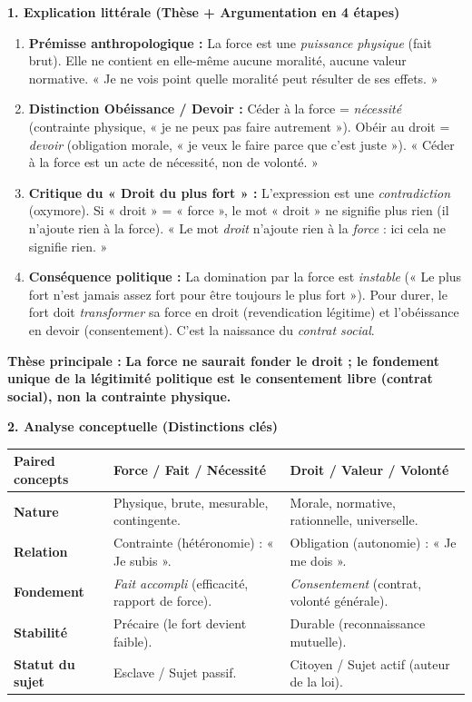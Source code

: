 \documentclass[11pt]{article}
\begin{document}
\begin{corrige}
\textbf{1. Explication littérale (Thèse + Argumentation en 4 étapes)}
\begin{enumerate}
    \item \textbf{Prémisse anthropologique :} La force est une \emph{puissance physique} (fait brut). Elle ne contient en elle-même aucune moralité, aucune valeur normative. « Je ne vois point quelle moralité peut résulter de ses effets. »
    \item \textbf{Distinction Obéissance / Devoir :} Céder à la force = \emph{nécessité} (contrainte physique, « je ne peux pas faire autrement »). Obéir au droit = \emph{devoir} (obligation morale, « je veux le faire parce que c'est juste »). « Céder à la force est un acte de nécessité, non de volonté. »
    \item \textbf{Critique du « Droit du plus fort » :} L'expression est une \emph{contradiction} (oxymore). Si « droit » = « force », le mot « droit » ne signifie plus rien (il n'ajoute rien à la force). « Le mot \emph{droit} n'ajoute rien à la \emph{force} : ici cela ne signifie rien. »
    \item \textbf{Conséquence politique :} La domination par la force est \emph{instable} (« Le plus fort n'est jamais assez fort pour être toujours le plus fort »). Pour durer, le fort doit \emph{transformer} sa force en droit (revendication légitime) et l'obéissance en devoir (consentement). C'est la naissance du \emph{contrat social}.
\end{enumerate}
\textbf{Thèse principale :} \textbf{La force ne saurait fonder le droit ; le fondement unique de la légitimité politique est le consentement libre (contrat social), non la contrainte physique.}

\textbf{2. Analyse conceptuelle (Distinctions clés)}
\begin{center}
\begin{tabularx}{\linewidth}{|l|X|X|}
\hline
\rowcolor{popblueL}
\textbf{Paired concepts} & \textbf{Force / Fait / Nécessité} & \textbf{Droit / Valeur / Volonté} \\
\hline
\textbf{Nature} & Physique, brute, mesurable, contingente. & Morale, normative, rationnelle, universelle. \\
\hline
\textbf{Relation} & Contrainte (hétéronomie) : « Je subis ». & Obligation (autonomie) : « Je me dois ». \\
\hline
\textbf{Fondement} & \emph{Fait accompli} (efficacité, rapport de force). & \emph{Consentement} (contrat, volonté générale). \\
\hline
\textbf{Stabilité} & Précaire (le fort devient faible). & Durable (reconnaissance mutuelle). \\
\hline
\textbf{Statut du sujet} & Esclave / Sujet passif. & Citoyen / Sujet actif (auteur de la loi). \\
\hline
\end{tabularx}
\end{center}


\end{corrige}
\end{document}
